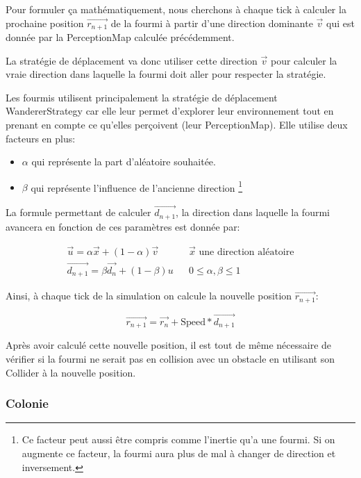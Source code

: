 \documentclass{EPUProjetDi}
\begin{document}
Pour formuler ça mathématiquement, nous cherchons à chaque tick à calculer la prochaine position $\vec{r_{n+1}}$ de la fourmi à partir
d'une direction dominante $\vec{v}$ qui est donnée par la PerceptionMap calculée précédemment.

La stratégie de déplacement va donc utiliser cette direction $\vec{v}$ pour calculer la vraie direction dans laquelle la fourmi doit aller 
pour respecter la stratégie.

Les fourmis utilisent principalement la stratégie de déplacement WandererStrategy car elle leur permet d'explorer leur environnement tout en prenant
en compte ce qu'elles perçoivent (leur PerceptionMap). Elle utilise deux facteurs en plus: 
\begin{itemize}
    \item $\alpha$ qui représente la part d'aléatoire souhaitée.
    \item $\beta$ qui représente l'influence de l'ancienne direction \footnote{Ce facteur peut aussi être compris comme l'inertie qu'a une fourmi.
    Si on augmente ce facteur, la fourmi aura plus de mal à changer de direction et inversement.}
\end{itemize}

La formule permettant de calculer $\vec{d_{n+1}}$, la direction dans laquelle la fourmi avancera en fonction de ces paramètres est donnée par:

\begin{subequations}
    \begin{align}
        \vec{u}=\alpha \vec{x} + (1 - \alpha) \vec{v} && \text{$\vec{x}$ une direction aléatoire} \\
        \tag{1.4}\vec{d_{n+1}}=\beta \vec{d_{n}} + (1-\beta)u &&  0\leqslant \alpha,\beta \leqslant 1
    \end{align}
\end{subequations}

Ainsi, à chaque tick de la simulation on calcule la nouvelle position $\vec{r_{n+1}}$:

\begin{equation}
    \vec{r_{n+1}} = \vec{r_{n}} + \text{Speed} * \vec{d_{n+1}}
\end{equation}

Après avoir calculé cette nouvelle position, il est tout de même nécessaire de vérifier si la fourmi ne serait pas en collision avec un obstacle en
utilisant son Collider à la nouvelle position. 

\subsubsection{Colonie}
\end{document}
